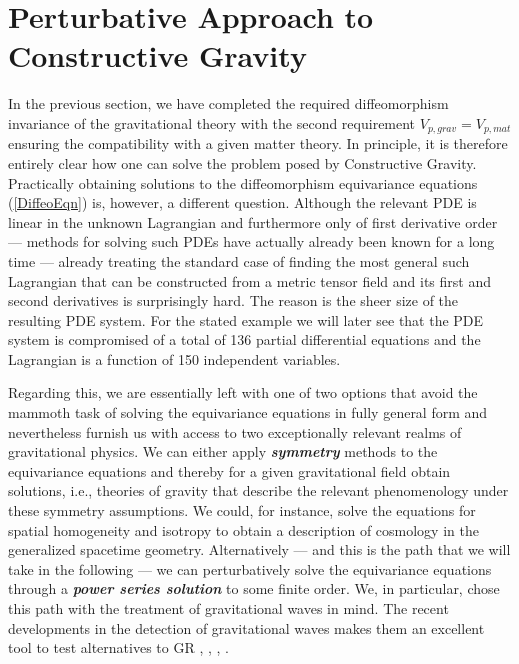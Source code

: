 \section{Perturbative Approach to Constructive Gravity}
In the previous section, we have completed the required diffeomorphism invariance of the gravitational theory with the second requirement $V_{p,grav}=V_{p,mat}$ ensuring the compatibility with a given matter theory. In principle, it is therefore entirely clear how one can solve the problem posed by Constructive Gravity. Practically obtaining solutions to the diffeomorphism equivariance equations (\ref{DiffeoEqn}) is, however, a different question. Although the relevant PDE is linear in the unknown Lagrangian and furthermore only of first derivative order --- methods for solving  such PDEs have actually already been known for a long time \cite{Han2015} --- already treating the standard case of finding the most general such Lagrangian that can be constructed from a metric tensor field and its first and second derivatives is surprisingly hard. The reason is the sheer size of the resulting PDE system. For the stated example we will later see that the PDE system is compromised of a total of 136 partial differential equations and the Lagrangian is a function of 150 independent variables.  

Regarding this, we are essentially left with one of two options that avoid the mammoth task of solving the equivariance equations in fully general form and nevertheless furnish us with access to two exceptionally relevant realms of gravitational physics. We can either apply \textbf{\textit{symmetry}} methods to the equivariance equations and thereby for a given gravitational field obtain solutions, i.e., theories of gravity that describe the relevant phenomenology under these symmetry assumptions. We could, for instance, solve the equations for spatial homogeneity and isotropy to obtain a description of cosmology in the generalized spacetime geometry. Alternatively --- and this is the path that we will take in the following --- we can perturbatively solve the equivariance equations through a \textit{\textbf{power series solution}} to some finite order. We, in particular, chose this path with the treatment of gravitational waves in mind.  The recent developments in the detection of gravitational waves makes them an excellent tool to test alternatives to GR \cite{2010PhRvD..81f4008Y}, \cite{2011PhRvD..83j4022B}, \cite{2017PhRvD..95j4027Z}, \cite{2013LRR....16....9Y}.


